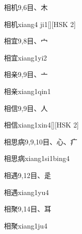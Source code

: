 \begin{entry}{相机}{9,6}{⽬、⽊}
  \begin{phonetics}{相机}{xiang4 ji1}[][HSK 2]
  \end{phonetics}
\end{entry}

\begin{entry}{相宜}{9,8}{⽬、⼧}
  \begin{phonetics}{相宜}{xiang1yi2}
  \end{phonetics}
\end{entry}

\begin{entry}{相亲}{9,9}{⽬、⼇}
  \begin{phonetics}{相亲}{xiang1qin1}
  \end{phonetics}
\end{entry}

\begin{entry}{相信}{9,9}{⽬、⼈}
  \begin{phonetics}{相信}{xiang1xin4}[][HSK 2]
  \end{phonetics}
\end{entry}

\begin{entry}{相思病}{9,9,10}{⽬、⼼、⽧}
  \begin{phonetics}{相思病}{xiang1si1bing4}
  \end{phonetics}
\end{entry}

\begin{entry}{相遇}{9,12}{⽬、⾡}
  \begin{phonetics}{相遇}{xiang1yu4}
  \end{phonetics}
\end{entry}

\begin{entry}{相聚}{9,14}{⽬、⽿}
  \begin{phonetics}{相聚}{xiang1ju4}
  \end{phonetics}
\end{entry}

